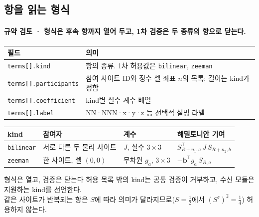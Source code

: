 \subsection{항을 읽는 형식}\label{term-schema}
\begingroup%
  \framesubtitle{규약 검토 · 형식은 후속 항까지 열어 두고, 1차 검증은 두 종류의 항으로 닫는다.}
  \small\renewcommand{\arraystretch}{1.12}
  \begin{tabularx}{\textwidth}{@{}p{4.1cm}Y@{}}
    \toprule
    필드 & 의미 \\
    \midrule
    \texttt{terms[].kind} & 항의 종류. 1차 허용값은 \texttt{bilinear}, \texttt{zeeman} \\
    \texttt{terms[].participants} & 참여 사이트 ID와 정수 셀 좌표 $n$의 목록; 길이는 kind가 정함 \\
    \texttt{terms[].coefficient} & kind별 실수 계수 배열 \\
    \texttt{terms[].label} & NN·NNN·x·y·z 등 선택적 설명 라벨 \\
    \bottomrule
  \end{tabularx}
  \par\smallskip
  \begin{tabularx}{\textwidth}{@{}p{1.6cm}p{3.2cm}p{2.6cm}Y@{}}
    \toprule
    kind & 참여자 & 계수 & 해밀토니안 기여 \\
    \midrule
    \texttt{bilinear} & 서로 다른 두 물리 사이트 & $J$, 실수 $3\times3$ & $S_{R+n_1,a}^{\mathsf T}\,J\,S_{R+n_2,b}$ \\
    \texttt{zeeman} & 한 사이트, 셀 $(0,0)$ & 무차원 $g_a$, $3\times3$ & $-\mathbf b^{\mathsf T}g_a\,S_{R,a}$ \\
    \bottomrule
  \end{tabularx}
  \par\smallskip
  \begin{band}{형식은 열고, 검증은 닫는다}
    허용 목록 밖의 kind는 공통 검증이 거부하고, 수신 모듈은 지원하는 kind를 선언한다.\\
    같은 사이트가 반복되는 항은 $S$에 따라 의미가 달라지므로($S=\tfrac12$에서 $(S^z)^2=\tfrac14$) 허용하지 않는다.
  \end{band}
\endgroup


